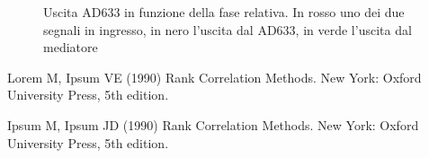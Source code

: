 \documentclass[10pt,letterpaper]{article}
\begin{document}
\begin{figure}[h]
\centering
{}
\qquad 
{}
   
\caption{Uscita AD633 in funzione della fase relativa. In rosso uno dei due segnali in ingresso, in nero l'uscita dal AD633, in verde l'uscita dal mediatore}
\label{subfig3}
\end{figure}


\begin{thebibliography}{10}
Lorem M, Ipsum VE (1990) Rank Correlation Methods. New York: Oxford University Press, 5th edition.

Ipsum M, Ipsum JD (1990) Rank Correlation Methods. New York: Oxford University Press, 5th edition.

\end{thebibliography}
\end{document}

